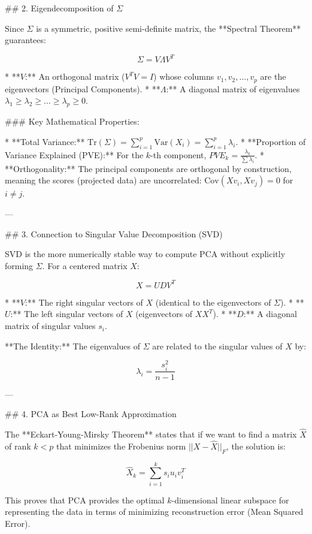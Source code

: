 ## 2. Eigendecomposition of \( \Sigma \)

Since \( \Sigma \) is a symmetric, positive semi-definite matrix, the **Spectral Theorem** guarantees:


\[ \Sigma = V \Lambda V^T \]

* **\( V \):** An orthogonal matrix (\( V^T V = I \)) whose columns \( v_1, v_2, \dots, v_p \) are the eigenvectors (Principal Components).
* **\( \Lambda \):** A diagonal matrix of eigenvalues \( \lambda_1 \ge \lambda_2 \ge \dots \ge \lambda_p \ge 0 \).

### Key Mathematical Properties:

* **Total Variance:** \( \text{Tr}(\Sigma) = \sum_{i=1}^p \text{Var}(X_i) = \sum_{i=1}^p \lambda_i \).
* **Proportion of Variance Explained (PVE):** For the \( k \)-th component, \( PVE_k = \frac{\lambda_k}{\sum \lambda_i} \).
* **Orthogonality:** The principal components are orthogonal by construction, meaning the scores (projected data) are uncorrelated: \( \text{Cov}(Xv_i, Xv_j) = 0 \) for \( i \neq j \).

---

## 3. Connection to Singular Value Decomposition (SVD)

SVD is the more numerically stable way to compute PCA without explicitly forming \( \Sigma \).
For a centered matrix \( X \):


\[ X = U D V^T \]

* **\( V \):** The right singular vectors of \( X \) (identical to the eigenvectors of \( \Sigma \)).
* **\( U \):** The left singular vectors of \( X \) (eigenvectors of \( XX^T \)).
* **\( D \):** A diagonal matrix of singular values \( s_i \).

**The Identity:** The eigenvalues of \( \Sigma \) are related to the singular values of \( X \) by:


\[ \lambda_i = \frac{s_i^2}{n-1} \]

---

## 4. PCA as Best Low-Rank Approximation

The **Eckart-Young-Mirsky Theorem** states that if we want to find a matrix \( \hat{X} \) of rank \( k < p \) that minimizes the Frobenius norm \( ||X - \hat{X}||_F \), the solution is:


\[ \hat{X}_k = \sum_{i=1}^k s_i u_i v_i^T \]


This proves that PCA provides the optimal \( k \)-dimensional linear subspace for representing the data in terms of minimizing reconstruction error (Mean Squared Error).

